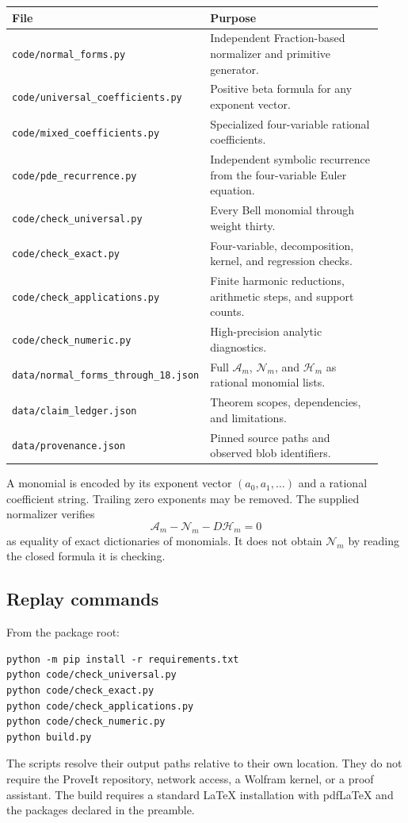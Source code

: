\documentclass[11pt,letterpaper]{article}
\numberwithin{equation}{section}
\theoremstyle{plain}
\theoremstyle{definition}
\theoremstyle{remark}
\newcommand{\Ac}{\mathcal A}\newcommand{\Nc}{\mathcal N}\newcommand{\Hc}{\mathcal H}
\newcommand{\src}[1]{\nolinkurl{#1}}
\begin{document}
\begin{center}
\small
\begin{tabular}{@{}p{0.41\linewidth}p{0.52\linewidth}@{}}
\toprule
File & Purpose\\
\midrule
\src{code/normal_forms.py} & Independent Fraction-based normalizer and primitive generator.\\
\src{code/universal_coefficients.py} & Positive beta formula for any exponent vector.\\
\src{code/mixed_coefficients.py} & Specialized four-variable rational coefficients.\\
\src{code/pde_recurrence.py} & Independent symbolic recurrence from the four-variable Euler equation.\\
\src{code/check_universal.py} & Every Bell monomial through weight thirty.\\
\src{code/check_exact.py} & Four-variable, decomposition, kernel, and regression checks.\\
\src{code/check_applications.py} & Finite harmonic reductions, arithmetic steps, and support counts.\\
\src{code/check_numeric.py} & High-precision analytic diagnostics.\\
\src{data/normal_forms_through_18.json} & Full $\Ac_m$, $\Nc_m$, and $\Hc_m$ as rational monomial lists.\\
\src{data/claim_ledger.json} & Theorem scopes, dependencies, and limitations.\\
\src{data/provenance.json} & Pinned source paths and observed blob identifiers.\\
\bottomrule
\end{tabular}
\end{center}

A monomial is encoded by its exponent vector $(a_0,a_1,\ldots)$ and a rational coefficient string. Trailing zero exponents may be removed. The supplied normalizer verifies
\[
 \Ac_m-\Nc_m-D\Hc_m=0
\]
as equality of exact dictionaries of monomials. It does not obtain $\Nc_m$ by reading the closed formula it is checking.

\subsection{Replay commands}

From the package root:
\begin{verbatim}
python -m pip install -r requirements.txt
python code/check_universal.py
python code/check_exact.py
python code/check_applications.py
python code/check_numeric.py
python build.py
\end{verbatim}
The scripts resolve their output paths relative to their own location. They do not require the ProveIt repository, network access, a Wolfram kernel, or a proof assistant. The build requires a standard LaTeX installation with pdfLaTeX and the packages declared in the preamble.
\end{document}
